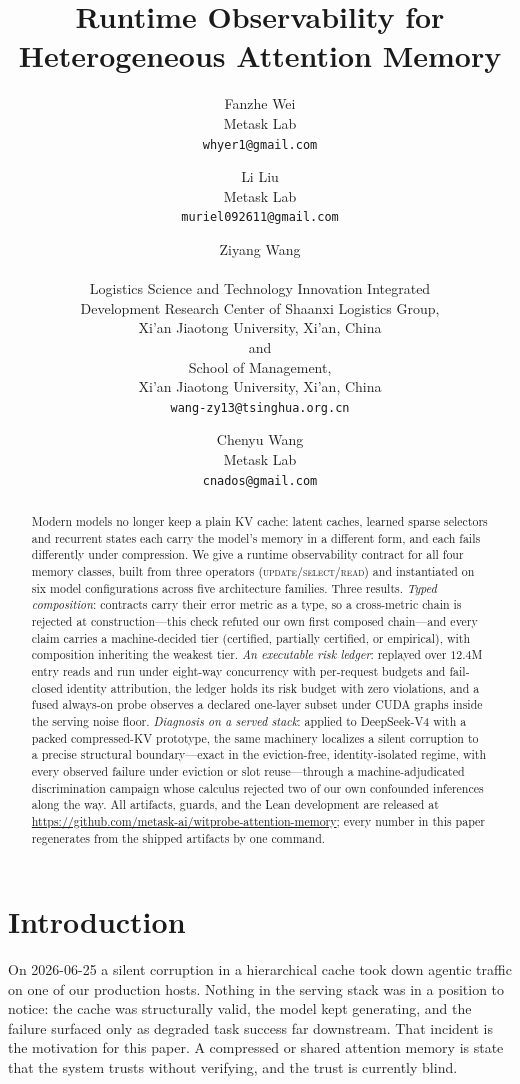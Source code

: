\documentclass[11pt]{article}
\title{Runtime Observability for Heterogeneous Attention Memory}
\author{%
  Fanzhe Wei\\ Metask Lab\\ {\small\texttt{whyer1@gmail.com}}
  \and Li Liu\\ Metask Lab\\ {\small\texttt{muriel092611@gmail.com}}
  \and Ziyang Wang\\
  {\small\begin{tabular}[t]{@{}c@{}}
   Logistics Science and Technology Innovation Integrated\\
   Development Research Center of Shaanxi Logistics Group,\\
   Xi'an Jiaotong University, Xi'an, China\\
   and\\
   School of Management,\\
   Xi'an Jiaotong University, Xi'an, China\\[2pt]
   \texttt{wang-zy13@tsinghua.org.cn}
   \end{tabular}}
  \and Chenyu Wang\\ Metask Lab\\ {\small\texttt{cnados@gmail.com}}}
\date{}
\begin{document}
\maketitle

\begin{abstract}
Modern models no longer keep a plain KV cache: latent caches, learned sparse
selectors and recurrent states each carry the model's memory in a different
form, and each fails differently under compression. We give a runtime
observability contract for all four memory classes, built from three
operators (\textsc{update}/\textsc{select}/\textsc{read}) and instantiated
on six model configurations across five architecture families. Three
results. \emph{Typed composition}: contracts carry their error metric as a
type, so a cross-metric chain is rejected at construction---this check
refuted our own first composed chain---and every claim carries a
machine-decided tier (certified, partially certified, or empirical), with
composition inheriting the weakest tier. \emph{An executable risk ledger}:
replayed over $12.4$M entry reads and run under eight-way concurrency with
per-request budgets and fail-closed identity attribution, the ledger holds
its risk budget with zero violations, and a fused always-on probe observes
a declared one-layer subset under CUDA graphs inside the serving noise
floor. \emph{Diagnosis on a served stack}: applied to DeepSeek-V4 with a
packed compressed-KV prototype, the same machinery localizes a silent
corruption to a precise structural boundary---exact in the eviction-free,
identity-isolated regime, with every observed failure under eviction or
slot reuse---through a machine-adjudicated discrimination campaign whose
calculus rejected two of our own confounded inferences along the way. All
artifacts, guards, and the Lean development are released at
\url{https://github.com/metask-ai/witprobe-attention-memory}; every number
in this paper regenerates from the shipped artifacts by one command.
\end{abstract}

\section{Introduction}
\label{sec:intro}
On 2026-06-25 a silent corruption in a hierarchical cache took down agentic traffic
on one of our production hosts. Nothing in the serving stack was in a position to
notice: the cache was structurally valid, the model kept generating, and the failure
surfaced only as degraded task success far downstream. That incident is the
motivation for this paper. A compressed or shared attention memory is state that the
system trusts without verifying, and the trust is currently blind.
\end{document}
